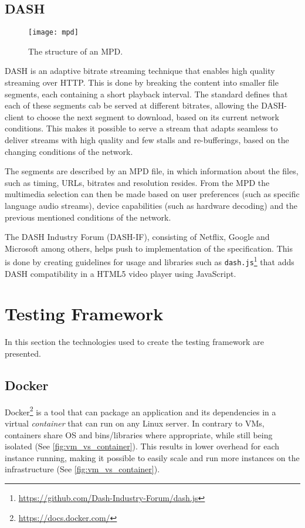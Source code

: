\subsection{\acl{DASH}}
\label{sec:rel-dash}

\begin{figure}
    \texttt{[image: mpd]}
    \caption[The structure of an \acs{MPD}.]{The structure of an \acs{MPD}.}
    \label{fig:mpd_structure}
\end{figure}

\ac{DASH} is an adaptive bitrate streaming technique that enables high quality streaming over \ac{HTTP}. This is done by breaking the content into smaller file segments, each containing a short playback interval. The standard defines that each of these segments cab be served at different bitrates, allowing the \ac{DASH}-client to choose the next segment to download, based on its current network conditions.
This makes it possible to serve a stream that adapts seamless to deliver streams with high quality and few stalls and re-bufferings, based on the changing conditions of the network.

The segments are described by an \ac{MPD} file, in which information about the files, such as timing, \ac{URL}s, bitrates and resolution resides. From the \ac{MPD} the multimedia selection can then be made based on user preferences (such as specific language audio streams), device capabilities (such as hardware decoding) and the previous mentioned conditions of the network.

The \ac{DASH} Industry Forum (DASH-IF), consisting of Netflix, Google and Microsoft among others, helps push to implementation of the specification\cite{ISO23009}. This is done by creating guidelines for usage and libraries such as \texttt{dash.js}\footnote{\url{https://github.com/Dash-Industry-Forum/dash.js}} that adds \ac{DASH} compatibility in a \ac{HTML}5 video player using JavaScript.

\section{Testing Framework}
In this section the technologies used to create the testing framework are presented.

\subsection{Docker}
 Docker\footnote{\url{https://docs.docker.com/}} is a tool that can package an application and its dependencies in a virtual \emph{container} that can run on any Linux server. In contrary to \acp{VM}, containers share \ac{OS} and bins/libraries where appropriate, while still being isolated (See \autoref{fig:vm_vs_container}). This results in lower overhead for each instance running, making it possible to easily scale and run more instances on the infrastructure (See \autoref{fig:vm_vs_container}).
 
